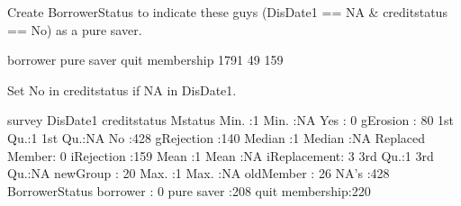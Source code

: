 
Create \textsf{BorrowerStatus} to indicate these guys (\textsf{DisDate1} == NA \& \textsf{creditstatus} == No) as a \textsf{pure saver}. \gobblepars
\begin{Schunk}
\begin{Soutput}

       borrower      pure saver quit membership 
           1791              49             159 
\end{Soutput}
\end{Schunk}
Set \textsf{No} in \textsf{creditstatus} if NA in \textsf{DisDate1}.
\begin{Schunk}
\begin{Soutput}
     survey     DisDate1            creditstatus         Mstatus   
 Min.   :1   Min.   :NA    Yes            :  0   gErosion    : 80  
 1st Qu.:1   1st Qu.:NA    No             :428   gRejection  :140  
 Median :1   Median :NA    Replaced Member:  0   iRejection  :159  
 Mean   :1   Mean   :NA                          iReplacement:  3  
 3rd Qu.:1   3rd Qu.:NA                          newGroup    : 20  
 Max.   :1   Max.   :NA                          oldMember   : 26  
             NA's   :428                                           
         BorrowerStatus
 borrower       :  0   
 pure saver     :208   
 quit membership:220   
                       
                       
                       
                       
\end{Soutput}
\end{Schunk}

